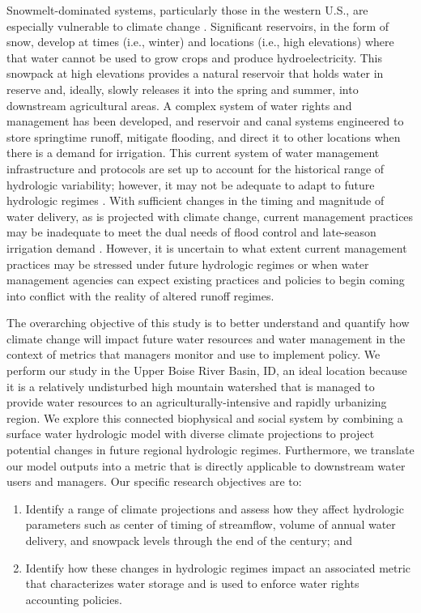 \documentclass[water,article,submit,moreauthors,pdftex,10pt,a4paper]{mdpi}
\theoremstyle{mdpi}
\newcounter{ex}
\newcounter{re}
\theoremstyle{mdpidefinition}
\begin{document}
Snowmelt-dominated systems, particularly those in the western U.S., are especially vulnerable to climate change \citep{Barnett:2005ci,Stewart:2009jn,Li:2017jn}. Significant reservoirs, in the form of snow, develop at times (i.e., winter) and locations (i.e., high elevations) where that water cannot be used to grow crops and produce hydroelectricity. This snowpack at high elevations provides a natural reservoir that holds water in reserve and, ideally, slowly releases it into the spring and summer, into downstream agricultural areas. A complex system of water rights and management has been developed, and reservoir and canal systems engineered to store springtime runoff, mitigate flooding, and direct it to other locations when there is a demand for irrigation. This current system of water management infrastructure and protocols are set up to account for the historical range of hydrologic variability; however, it may not be adequate to adapt to future hydrologic regimes \citep{Palmer:2008dv}. With sufficient changes in the timing and magnitude of water delivery, as is projected with climate change, current management practices may be inadequate to meet the dual needs of flood control and late-season irrigation demand \citep{Barnett:2005ci}. However, it is uncertain to what extent current management practices may be stressed under future hydrologic regimes or when water management agencies can expect existing practices and policies to begin coming into conflict with the reality of altered runoff regimes. 

The overarching objective of this study is to better understand and quantify how climate change will impact future water resources and water management in the context of metrics that managers monitor and use to implement policy. We perform our study in the Upper Boise River Basin, ID, an ideal location because it is a relatively undisturbed high mountain watershed that is managed to provide water resources to an agriculturally-intensive and rapidly urbanizing region. We explore this connected biophysical and social system by combining a surface water hydrologic model with diverse climate projections to project potential changes in future regional hydrologic regimes. Furthermore, we translate our model outputs into a metric that is directly applicable to downstream water users and managers. Our specific research objectives are to:

\begin{enumerate}
\item Identify a range of climate projections and assess how they affect hydrologic parameters such as center of timing of streamflow, volume of annual water delivery, and snowpack levels through the end of the century; and
\item Identify how these changes in hydrologic regimes impact an associated metric that characterizes water storage and is used to enforce water rights accounting policies.
\end{enumerate}
\end{document}

